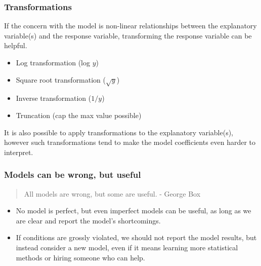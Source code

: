 
\begin{frame}
\frametitle{Transformations}

If the concern with the model is non-linear relationships between the explanatory 
variable(s) and the response variable, transforming the response variable can be helpful. 

\begin{itemize}

\item Log transformation (log $y$)
\item Square root transformation ($\sqrt{y}$)
\item Inverse transformation ($1/y$)
\item Truncation (cap the max value possible)

\end{itemize}

It is also possible to apply transformations to the explanatory variable(s), however 
such transformations tend to make the model coefficients even harder to interpret.

\end{frame}


\begin{frame}
\frametitle{Models can be wrong, but useful}

\begin{quote}
All models are wrong, but some are useful. - George Box
\end{quote}

\begin{itemize}

\item No model is perfect, but even imperfect models can be useful, as long as we are clear and report the model's shortcomings.

\item If conditions are grossly violated, we should not report the model results, but instead consider a new model, even if it means learning more statistical methods or hiring someone who can help.

\end{itemize}

\end{frame}

